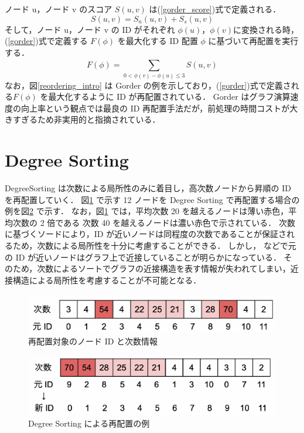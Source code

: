 ノード u，ノード v のスコア $S(u,v)$ は(\ref{gorder_score})式で定義される．
\begin{equation}
  S(u,v) = S_{n}(u,v) + S_{s}(u,v) \label{gorder_score}
\end{equation}
そして，ノード u，ノード v の ID がそれぞれ $\phi(u)$，$\phi(v)$に変換される時，
(\ref{gorder})式で定義する $F(\phi)$ を最大化する ID 配置 $\phi$ に基づいて再配置を実行する．
\begin{equation}
  F(\phi) = \sum_{0<\phi(v)-\phi(u)\leq3}^{} S(u,v) \label{gorder}
\end{equation}
なお，図\ref{reordering_intro} は Gorder の例を示しており，(\ref{gorder})式で定義される$F(\phi)$ を最大化するように ID が再配置されている．
Gorder はグラフ演算速度の向上率という観点では最良の ID 再配置手法だが，前処理の時間コストが大きすぎるため非実用的と指摘されている\cite{balaji2018graph, faldu2019closer}．
\section{Degree Sorting}
DegreeSorting は次数による局所性のみに着目し，高次数ノードから昇順の ID を再配置していく．
図\ref{Original} で示す 12 ノードを Degree Sorting で再配置する場合の例を図\ref{degree_sorting} で示す．
なお，図\ref{Original} では，平均次数 20 を越えるノードは薄い赤色，平均次数の 2 倍である 次数 40 を越えるノードは濃い赤色で示されている．
次数に基づくソードにより，ID が近いノードは同程度の次数であることが保証されるため，次数による局所性を十分に考慮することができる．
しかし，\cite{balaji2018graph, faldu2019closer} などで元の ID が近いノードはグラフ上で近接していることが明らかになっている．
そのため，次数によるソートでグラフの近接構造を表す情報が失われてしまい，近接構造による局所性を考慮することが不可能となる．
\begin{figure}[t]
  \centering
  \includegraphics[width=\linewidth]{./figure/original.pdf}
  \caption{再配置対象のノード ID と次数情報}
  \label{Original}
\end{figure}
\begin{figure}[t]
  \centering
  \includegraphics[width=\linewidth]{./figure/degree_sorting.pdf}
  \caption{Degree Sorting による再配置の例}
  \label{degree_sorting}
\end{figure}
